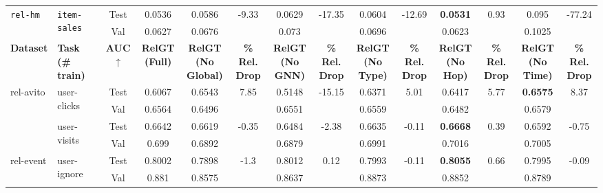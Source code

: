 \documentclass{article} %
\begin{document}
\begin{table}[ht]
{\begin{tabular}{llcc|cc|cc|cc|cc|cc}
\midrule
\multirow{2}{*}{\texttt{rel-hm}} & \multirow{2}{*}{\texttt{item-sales}} & Test & 0.0536 & 0.0586 & -9.33 & 0.0629 & -17.35 & 0.0604 & -12.69 & \textbf{0.0531} & 0.93 & 0.095 & -77.24 \\ & & Val & 0.0627 & 0.0676 &  & 0.073 &  & 0.0696 &  & 0.0623 &  & 0.1025 &  \\

\bottomrule
\toprule
\textbf{Dataset} & 
\textbf{Task (\# train)} & 
\textbf{AUC $\uparrow$} & 
\makecell{\textbf{RelGT}\\ \textbf{(Full)}} & \makecell{\textbf{RelGT}\\\textbf{(No Global)}} & 
\makecell{\textbf{\% Rel.}\\\textbf{Drop}} &
\makecell{\textbf{RelGT}\\\textbf{(No GNN)}} & 
\makecell{\textbf{\% Rel.}\\\textbf{Drop}} &
\makecell{\textbf{RelGT}\\\textbf{(No Type)}} & 
\makecell{\textbf{\% Rel.}\\\textbf{Drop}} &
\makecell{\textbf{RelGT}\\\textbf{(No Hop)}} & 
\makecell{\textbf{\% Rel.}\\\textbf{Drop}} &
\makecell{\textbf{RelGT}\\\textbf{(No Time)}} & 
\makecell{\textbf{\% Rel.}\\\textbf{Drop}} \\

\midrule

\multirow{4}{*}{rel-avito} & \multirow{2}{*}{user-clicks} & Test & 0.6067 & 0.6543 & 7.85 & 0.5148 & -15.15 & 0.6371 & 5.01 & 0.6417 & 5.77 & \textbf{0.6575} & 8.37 \\ & & Val & 0.6564 & 0.6496 &  & 0.6551 &  & 0.6559 &  & 0.6482 &  & 0.6579 &  \\ & \multirow{2}{*}{user-visits} & Test & 0.6642 & 0.6619 & -0.35 & 0.6484 & -2.38 & 0.6635 & -0.11 & \textbf{0.6668} & 0.39 & 0.6592 & -0.75 \\ & & Val & 0.699 & 0.6892 &  & 0.6879 &  & 0.6991 &  & 0.7016 &  & 0.7005 &  \\

\midrule
\multirow{2}{*}{rel-event} & \multirow{2}{*}{user-ignore} & Test & 0.8002 & 0.7898 & -1.3 & 0.8012 & 0.12 & 0.7993 & -0.11 & \textbf{0.8055} & 0.66 & 0.7995 & -0.09 \\ & & Val & 0.881 & 0.8575 &  & 0.8637 &  & 0.8873 &  & 0.8852 &  & 0.8789 &  \\


\end{tabular}}
\end{table}
\end{document}
